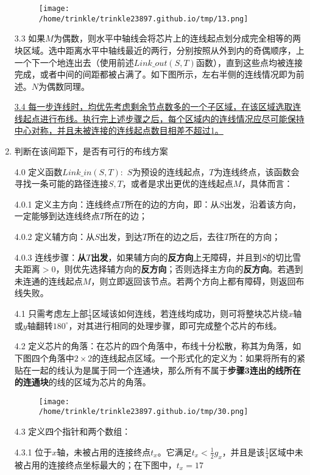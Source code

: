 \documentclass[]{article}
\begin{document}
\begin{enumerate}
  \begin{figure}[htbp]
  \centering
  \texttt{[image: /home/trinkle/trinkle23897.github.io/tmp/13.png]}
  \caption{}
  \end{figure}

  3.3
  如果\(M\)为偶数，则水平中轴线会将芯片上的连线起点划分成完全相等的两块区域。选中距离水平中轴线最近的两行，分别按照从外到内的奇偶顺序，上一个下一个地连出去（使用前述\(Link\_out(S,T)\)函数），直到这些点均被连接完成，或者中间的间距都被占满了。如下图所示，左右半侧的连线情况即为前述。\(N\)为偶数同理。

  \underline{3.4
  每一步连线时，均优先考虑剩余节点数多的一个子区域，在该区域选取连线起点进行布线。执行完上述步骤之后，每个区域内的连线情况应尽可能保持中心对称，并且未被连接的连线起点数目相差不超过1。}
\item
  判断在该间距下，是否有可行的布线方案

  4.0 定义函数\(Link\_in(S,T):\)
  \(S\)为预设的连线起点，\(T\)为连线终点，该函数会寻找一条可能的路径连接\(S,T\)，或者是求出更优的连线起点\(M\)，具体而言：

   4.0.1
  定义主方向：连线终点\(T\)所在的边的方向，即：从\(S\)出发，沿着该方向，一定能够到达连线终点\(T\)所在的边；

   4.0.2
  定义辅方向：从\(S\)出发，到达\(T\)所在的边之后，去往\(T\)所在的方向；

   4.0.3
  连线步骤：\textbf{从\(T\)出发}，如果辅方向的\textbf{反方向}上无障碍，并且到\(S\)的切比雪夫距离\(>0\)，则优先选择辅方向的\textbf{反方向}；否则选择主方向的\textbf{反方向}。若遇到未连通的连线起点\(M\)，则立即返回该节点。若两个方向上都有障碍，则返回布线失败。

  4.1
  只需考虑左上部\(\frac{1}{4}\)区域该如何连线，若连线均成功，则可将整块芯片绕\(x\)轴或\(y\)轴翻转\(180^\circ\)，对其进行相同的处理步骤，即可完成整个芯片的布线。

  4.2
  定义芯片的角落：在芯片的四个角落中，布线十分松散，称其为角落，如下图四个角落中\(2\times 2\)的连线起点区域。一个形式化的定义为：如果将所有的紧贴在一起的线认为是属于同一个连通块，那么所有不属于\textbf{步骤3连出的线所在的连通块}的线的区域为芯片的角落。

  \begin{figure}[htbp]
  \centering
  \texttt{[image: /home/trinkle/trinkle23897.github.io/tmp/30.png]}
  \caption{}
  \end{figure}

  4.3 定义四个指针和两个数组：

   4.3.1
  位于\(x\)轴，未被占用的连接终点\(t_x\)。它满足\(t_x<\frac{1}{2}g_x\)，并且是该\(\frac{1}{4}\)区域中未被占用的连接终点坐标最大的；在下图中，\(t_x=17\)


\end{enumerate}
\end{document}
